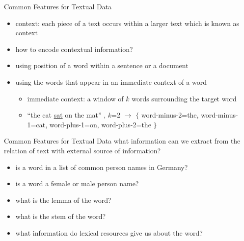 \begin{frame}{Common Features for Textual Data}
\begin{itemize}
\item<1-> context: each piece of a text occurs within a larger text which is known as context
\item<2-> how to encode contextual information?
    \item<3-> using position of a word within a sentence or a document
    \item<4-> using the words that appear in an immediate context of a word
    \begin{itemize}
        \item<5-> immediate context: a window of $k$ words surrounding the target word
        \item<6-> ``the cat \underline{sat} on the mat'' , $k$=2 $\rightarrow$ $\{$ word-minus-2=the, word-minus-1=cat, word-plus-1=on, word-plus-2=the $\}$
    \end{itemize}
\end{itemize}
\end{frame}
\begin{frame}{Common Features for Textual Data}
    what information can we extract from the relation of text with external source of information?
    \begin{itemize}
        \item<1-> is a word in a list of common person names in Germany? 
        \item<2-> is a word a female or male person name?
        \item<3-> what is the lemma of the word?
        \item<4-> what is the stem of the word?
        \item<5-> what information do lexical resources give us about the word?
    \end{itemize}
\end{frame}
